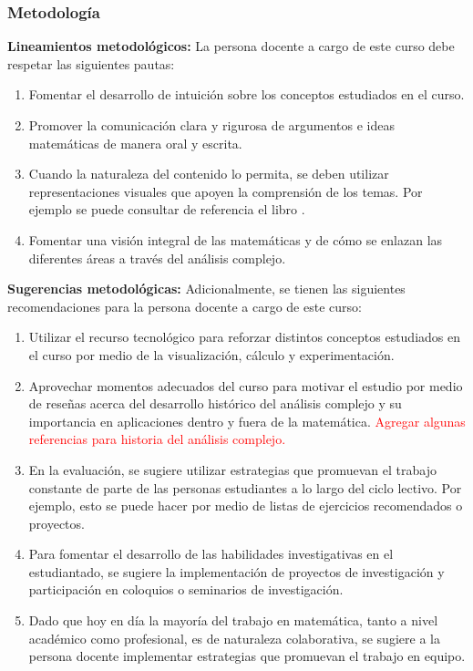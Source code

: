 \begin{refsection}
\begin{enumerate}
\end{enumerate}

\subsubsection*{Metodología}

\noindent \textbf{Lineamientos metodológicos:} La persona docente a cargo de este curso debe respetar las siguientes pautas:
\begin{enumerate}
    \item Fomentar el desarrollo de intuición sobre los conceptos estudiados en el curso.
    \item Promover la comunicación clara y rigurosa de argumentos e ideas matemáticas de manera oral y escrita.
    \item Cuando la naturaleza del contenido lo permita, se deben utilizar representaciones visuales que apoyen la comprensión de los temas. Por ejemplo se puede consultar de referencia el libro \cite{Nee23}.
    \item Fomentar una visión integral de las matemáticas y de cómo se enlazan las diferentes áreas a través del análisis complejo.
\end{enumerate}

\textbf{Sugerencias metodológicas:} Adicionalmente, se tienen las siguientes recomendaciones para la persona docente a cargo de este curso:
\begin{enumerate}
    \item Utilizar el recurso tecnológico para reforzar distintos conceptos estudiados en el curso por medio de la visualización, cálculo y experimentación.
    \item Aprovechar momentos adecuados del curso para motivar el estudio por medio de reseñas acerca del desarrollo histórico del análisis complejo y su importancia en aplicaciones dentro y fuera de la matemática. \textcolor{red}{Agregar algunas referencias para historia del análisis complejo.}
    \item En la evaluación, se sugiere utilizar estrategias que promuevan el trabajo constante de parte de las personas estudiantes a lo largo del ciclo lectivo. Por ejemplo, esto se puede hacer por medio de listas de ejercicios recomendados o proyectos.
    \item Para fomentar el desarrollo de las habilidades investigativas en el estudiantado, se sugiere la implementación de proyectos de investigación y participación en coloquios o seminarios de investigación.
    \item Dado que hoy en día la mayoría del trabajo en matemática, tanto a nivel académico como profesional, es de naturaleza colaborativa, se sugiere a la persona docente implementar estrategias que promuevan el trabajo en equipo.
\end{enumerate}



\end{refsection}
